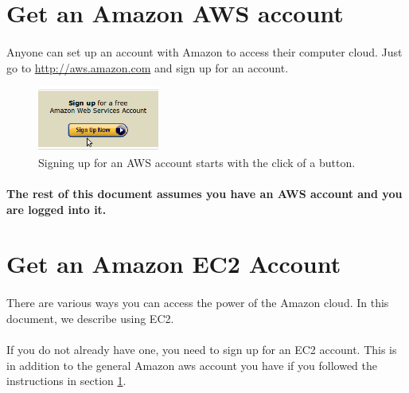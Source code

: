 \section{Get an Amazon AWS account}
\label{section:getaccount}
\paragraph{}Anyone can set up an account with Amazon to access their computer cloud. Just go to \href{http://aws.amazon.com}{http://aws.amazon.com} and sign up for an account.

\begin{figure}
\includegraphics[width=40mm]{"images/aws_signup_button"}
\caption[Sign up for AWS]{\label{fig:aws_signup}Signing up for an AWS account starts with the click of a button.}
\end{figure}

\paragraph{The rest of this document assumes you have an AWS account and you are logged into it.}

\section{Get an Amazon EC2 Account}

\paragraph{}There are various ways you can access the power of the Amazon cloud. In this document, we describe using EC2. 

\paragraph{}If you do not already have one, you need to sign up for an EC2 account. This is in addition to the general Amazon aws account you have if you followed the instructions in section \ref{section:getaccount}. 

